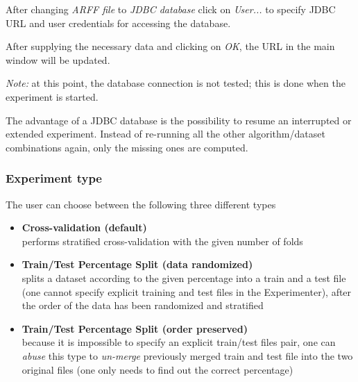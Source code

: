 \documentclass[a4paper]{article}
\begin{document}
After changing \textit{ARFF file} to \textit{JDBC database} click on \textit{User...} to specify JDBC URL and user credentials for accessing the database.

\begin{center}
\end{center}


After supplying the necessary data and clicking on \textit{OK}, the URL in the main window will be updated.

\textit{Note:} at this point, the database connection is not tested; this is done when the experiment is started.

\begin{center}
\end{center}


The advantage of a JDBC database is the possibility to resume an interrupted or extended experiment. Instead of re-running all the other algorithm/dataset combinations again, only the missing ones are computed.


\subsubsection{Experiment type}

The user can choose between the following three different types

\begin{itemize}
	\item \textbf{Cross-validation (default)} \\
      performs stratified cross-validation with the given number of folds 

   \item \textbf{Train/Test Percentage Split (data randomized)} \\
      splits a dataset according to the given percentage into a train and a test file (one cannot specify explicit training and test files in the Experimenter), after the order of the data has been randomized and
      stratified

	
	\begin{center}
	\end{center}
	

    \item \textbf{Train/Test Percentage Split (order preserved)} \\
      because it is impossible to specify an explicit train/test files pair, one can \textit{abuse} this type to \textit{un-merge} previously merged train and test file into the two original files (one only needs to find out the correct percentage) 

	
	\begin{center}
	\end{center}
	
\end{itemize}
\end{document}

